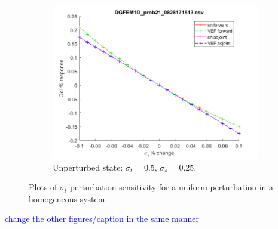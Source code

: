 \documentclass{article}
\newcommand{\sigt}{\sigma_t}
\newcommand{\sigs}{\sigma_s}
\newcommand{\comment}[2]{\marginpar{\textcolor{#2}{$\star$}}\textcolor{#2}{#1}\newline}
\newcommand{\jcr}[1]{\comment{#1}{blue}}
\newcommand{\jcr}[1]{\phantom{a}}
\begin{document}
\begin{figure}[H]
\begin{subfigure}{.65\textwidth}
  \centering
  \includegraphics[width=.98\linewidth]{figures/21sigtSens.png}
  \caption{Unperturbed state: $\sigt=0.5$, $\sigs=0.25$.}
  \label{fig:sfig3}
\end{subfigure}
\caption{Plots of $\sigt$ perturbation sensitivity for a uniform perturbation in a homogeneous system.}
\label{fig:fig}
\end{figure}

\jcr{change the other figures/caption in the same manner}
\end{document}
